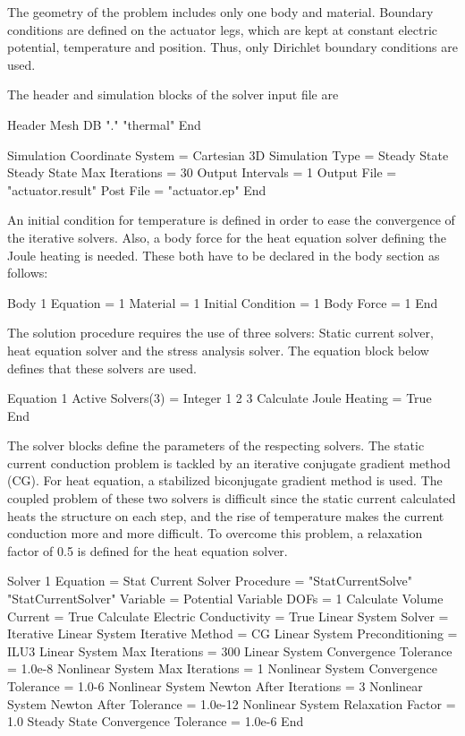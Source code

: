 The geometry of the problem includes only one body and
material. Boundary conditions are defined on the actuator legs, which
are kept at constant electric potential, temperature and
position. Thus, only Dirichlet boundary conditions are used.

The header and simulation blocks of the solver input file are

\ttbegin
Header
  Mesh DB "." "thermal"
End

Simulation
  Coordinate System = Cartesian 3D
  Simulation Type = Steady State
  Steady State Max Iterations = 30
  Output Intervals = 1
  Output File = "actuator.result"
  Post File = "actuator.ep"
End
\ttend

An initial condition for temperature is defined in order to ease the
convergence of the iterative solvers. Also, a body force for the
heat equation solver defining the Joule heating is needed. These
both have to be declared in the body section as follows:

\ttbegin
Body 1
  Equation = 1
  Material = 1
  Initial Condition = 1
  Body Force = 1
End
\ttend

The solution procedure requires the use of three solvers: Static
current solver, heat equation solver and the stress analysis
solver. The equation block below defines that these solvers are
used. 

\ttbegin
Equation 1
  Active Solvers(3) = Integer 1 2 3
  Calculate Joule Heating = True
End
\ttend

The solver blocks define the parameters of the respecting solvers. The
static current conduction problem is tackled by an iterative conjugate
gradient method (CG). For heat equation, a stabilized biconjugate
gradient method is used. The coupled problem of these two solvers is
difficult since the static current calculated heats the structure on
each step, and the rise of temperature makes the current conduction
more and more difficult. To overcome this problem, a relaxation factor
of 0.5 is defined for the heat equation solver.

\ttbegin
Solver 1
  Equation = Stat Current Solver
  Procedure = "StatCurrentSolve" "StatCurrentSolver"
  Variable = Potential
  Variable DOFs = 1
  Calculate Volume Current = True
  Calculate Electric Conductivity = True
  Linear System Solver = Iterative
  Linear System Iterative Method = CG
  Linear System Preconditioning = ILU3
  Linear System Max Iterations = 300
  Linear System Convergence Tolerance = 1.0e-8
  Nonlinear System Max Iterations = 1
  Nonlinear System Convergence Tolerance = 1.0-6
  Nonlinear System Newton After Iterations = 3
  Nonlinear System Newton After Tolerance = 1.0e-12
  Nonlinear System Relaxation Factor = 1.0
  Steady State Convergence Tolerance = 1.0e-6
End

